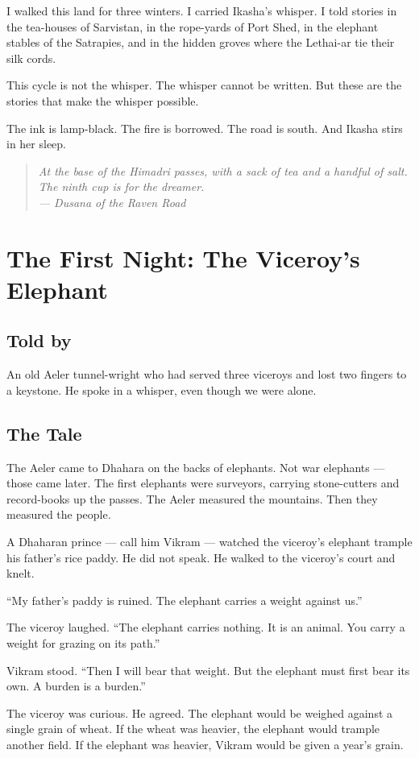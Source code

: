 \documentclass[10pt,twoside]{book}
\newcommand{\dusana}[1]{\begin{quote}\itshape #1 \\ --- Dusana of the Raven Road\end{quote}}
\begin{document}
I walked this land for three winters. I carried Ikasha's whisper. I told stories in the tea-houses of Sarvistan, in the rope-yards of Port Shed, in the elephant stables of the Satrapies, and in the hidden groves where the Lethai-ar tie their silk cords.

This cycle is not the whisper. The whisper cannot be written. But these are the stories that make the whisper possible.

The ink is lamp-black. The fire is borrowed. The road is south. And Ikasha stirs in her sleep.

\dusana{At the base of the Himadri passes, with a sack of tea and a handful of salt. The ninth cup is for the dreamer.}


\chapter{The First Night: The Viceroy's Elephant}

\section*{Told by}
An old Aeler tunnel-wright who had served three viceroys and lost two fingers to a keystone. He spoke in a whisper, even though we were alone.

\section*{The Tale}
The Aeler came to Dhahara on the backs of elephants. Not war elephants --- those came later. The first elephants were surveyors, carrying stone-cutters and record-books up the passes. The Aeler measured the mountains. Then they measured the people.

A Dhaharan prince --- call him Vikram --- watched the viceroy's elephant trample his father's rice paddy. He did not speak. He walked to the viceroy's court and knelt.

``My father's paddy is ruined. The elephant carries a weight against us.''

The viceroy laughed. ``The elephant carries nothing. It is an animal. You carry a weight for grazing on its path.''

Vikram stood. ``Then I will bear that weight. But the elephant must first bear its own. A burden is a burden.''

The viceroy was curious. He agreed. The elephant would be weighed against a single grain of wheat. If the wheat was heavier, the elephant would trample another field. If the elephant was heavier, Vikram would be given a year's grain.
\end{document}
